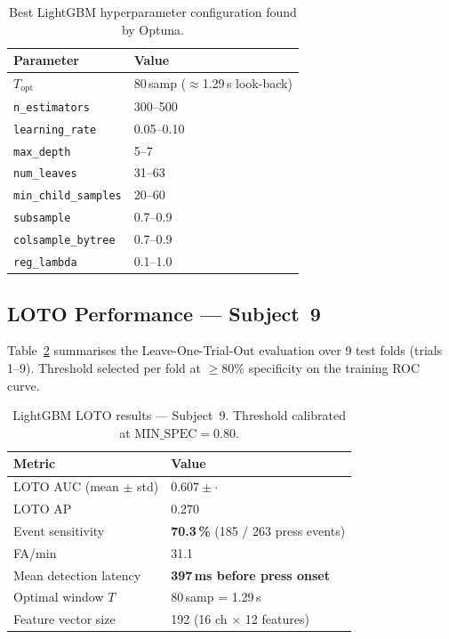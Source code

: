 \documentclass[12pt,a4paper]{article}
\begin{document}
\begin{table}[ht]
\centering
\caption{Best LightGBM hyperparameter configuration found by Optuna.}
\label{tab:best_params}
\begin{tabular}{ll}
\toprule
Parameter & Value \\
\midrule
$T_{\text{opt}}$ & 80\,samp ($\approx$1.29\,s look-back) \\
\texttt{n\_estimators} & 300--500 \\
\texttt{learning\_rate} & 0.05--0.10 \\
\texttt{max\_depth} & 5--7 \\
\texttt{num\_leaves} & 31--63 \\
\texttt{min\_child\_samples} & 20--60 \\
\texttt{subsample} & 0.7--0.9 \\
\texttt{colsample\_bytree} & 0.7--0.9 \\
\texttt{reg\_lambda} & 0.1--1.0 \\
\bottomrule
\end{tabular}
\end{table}

\subsection{LOTO Performance — Subject~9}

Table~\ref{tab:results} summarises the Leave-One-Trial-Out evaluation over
9 test folds (trials 1--9). Threshold selected per fold at $\geq$80\%
specificity on the training ROC curve.

\begin{table}[ht]
\centering
\caption{LightGBM LOTO results — Subject~9. Threshold calibrated at
  $\text{MIN\_SPEC} = 0.80$.}
\label{tab:results}
\begin{tabular}{ll}
\toprule
Metric & Value \\
\midrule
LOTO AUC (mean $\pm$ std) & $0.607 \pm \cdot$ \\
LOTO AP & 0.270 \\
Event sensitivity & \textbf{70.3\,\%} (185 / 263 press events) \\
FA/min & 31.1 \\
Mean detection latency & \textbf{397\,ms before press onset} \\
Optimal window $T$ & 80\,samp = 1.29\,s \\
Feature vector size & 192 (16 ch $\times$ 12 features) \\
\bottomrule
\end{tabular}
\end{table}
\end{document}
